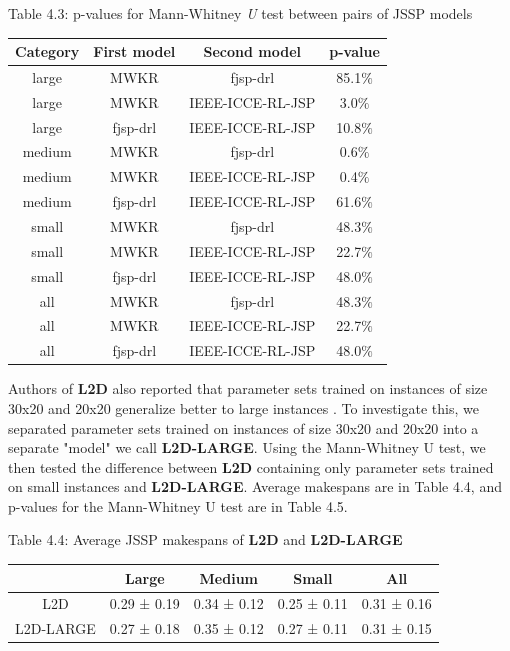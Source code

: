 \begin{table}
    Table 4.3: p-values for Mann-Whitney \textit{U} test between pairs of JSSP models\\
    \vspace{1mm}
    \label{table:4.3}
    \begin{tabular}{cccc}
    \toprule
    Category & First model & Second model & p-value \\
    \midrule
    large & MWKR & fjsp-drl & 85.1$\%$ \\
    large & MWKR & IEEE-ICCE-RL-JSP & 3.0$\%$ \\
    large & fjsp-drl & IEEE-ICCE-RL-JSP & 10.8$\%$ \\
    \hline
    medium & MWKR & fjsp-drl & 0.6$\%$ \\
    medium & MWKR & IEEE-ICCE-RL-JSP & 0.4$\%$ \\
    medium & fjsp-drl & IEEE-ICCE-RL-JSP & 61.6$\%$ \\
    \hline
    small & MWKR & fjsp-drl & 48.3$\%$ \\
    small & MWKR & IEEE-ICCE-RL-JSP & 22.7$\%$ \\
    small & fjsp-drl & IEEE-ICCE-RL-JSP & 48.0$\%$ \\
    \hline
    all & MWKR & fjsp-drl & 48.3$\%$ \\
    all & MWKR & IEEE-ICCE-RL-JSP & 22.7$\%$ \\
    all & fjsp-drl & IEEE-ICCE-RL-JSP & 48.0$\%$ \\
    \bottomrule
    \end{tabular}
\end{table}


Authors of \textbf{L2D} also reported that parameter sets trained on instances of size 30x20 and 20x20 generalize better to large instances \cite{zhang2020learning}. To investigate this, we separated parameter sets trained on instances of size 30x20 and 20x20 into a separate "model" we call \textbf{L2D-LARGE}. Using the Mann-Whitney U test, we then tested the difference between \textbf{L2D} containing only parameter sets trained on small instances and \textbf{L2D-LARGE}. Average makespans are in Table 4.4, and p-values for the Mann-Whitney U test are in Table 4.5.

\begin{table}
    Table 4.4: Average JSSP makespans of \textbf{L2D} and \textbf{L2D-LARGE}\\
    \vspace{1mm}
\begin{tabular}{ccccc}
    \toprule
    & Large & Medium & Small & All \\
    \midrule
    L2D & 0.29 ± 0.19 & 0.34 ± 0.12 & 0.25 ± 0.11 & 0.31 ± 0.16 \\
    L2D-LARGE & 0.27 ± 0.18 & 0.35 ± 0.12 & 0.27 ± 0.11 & 0.31 ± 0.15 \\
    \bottomrule
    \end{tabular}
\end{table}

